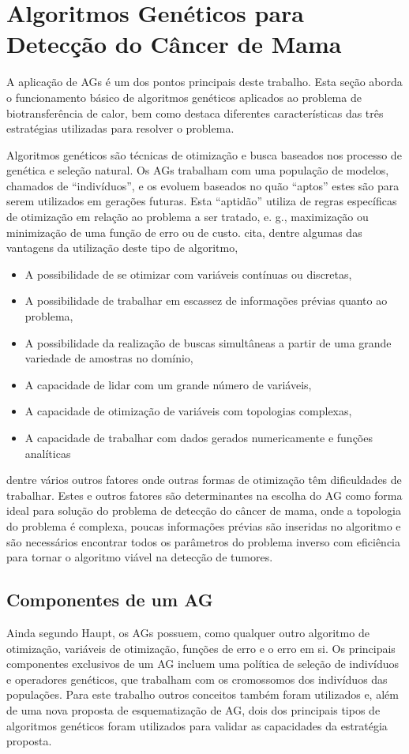 \chapter{Algoritmos Genéticos para Detecção do Câncer de Mama}
A aplicação de AGs é um dos pontos principais deste trabalho. Esta seção aborda o funcionamento básico de algoritmos genéticos aplicados ao problema de biotransferência de calor, bem como destaca diferentes características das três estratégias utilizadas para resolver o problema.

Algoritmos genéticos são técnicas de otimização e busca baseados nos processo de genética e seleção natural. Os AGs trabalham com uma população de modelos, chamados de ``indivíduos'', e os evoluem baseados no quão ``aptos'' estes são para serem utilizados em gerações futuras. Esta ``aptidão'' utiliza de regras específicas de otimização em relação ao problema a ser tratado, e. g., maximização ou minimização de uma função de erro ou de custo.  cita, dentre algumas das vantagens da utilização deste tipo de algoritmo,
\begin{itemize}
\item A possibilidade de se otimizar com variáveis contínuas ou discretas,
\item A possibilidade de trabalhar em escassez de informações prévias quanto ao problema,
\item A possibilidade da realização de buscas simultâneas a partir de uma grande variedade de amostras no domínio,
\item A capacidade de lidar com um grande número de variáveis,
\item A capacidade de otimização de variáveis com topologias complexas,
\item A capacidade de trabalhar com dados gerados numericamente e funções analíticas
\end{itemize}

\noindent dentre vários outros fatores onde outras formas de otimização têm dificuldades de trabalhar. Estes e outros fatores são determinantes na escolha do AG como forma ideal para solução do problema de detecção do câncer de mama, onde a topologia do problema é complexa, poucas informações prévias são inseridas no algoritmo e são necessários encontrar todos os parâmetros do problema inverso com eficiência para tornar o algoritmo viável na detecção de tumores.

\section{Componentes de um AG}
Ainda segundo Haupt, os AGs possuem, como qualquer outro algoritmo de otimização, variáveis de otimização, funções de erro e o erro em si. Os principais componentes exclusivos de um AG incluem uma política de seleção de indivíduos e operadores genéticos, que trabalham com os cromossomos dos indivíduos das populações. Para este trabalho outros conceitos também foram utilizados e, além de uma nova proposta de esquematização de AG, dois dos principais tipos de algoritmos genéticos foram utilizados para validar as capacidades da estratégia proposta.

